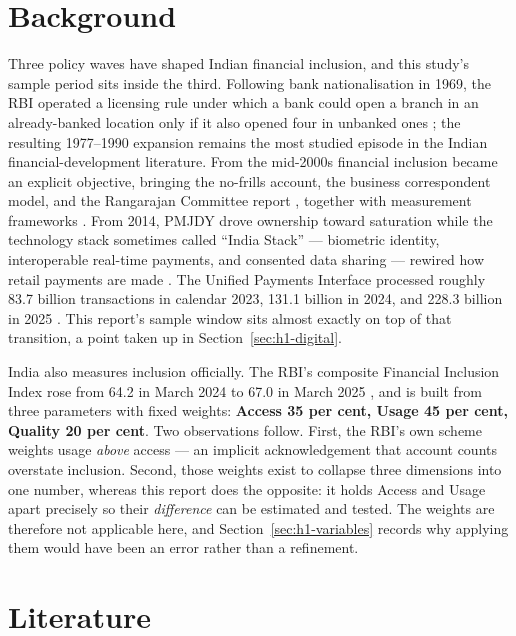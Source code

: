 \section{Background}
\label{sec:background}

Three policy waves have shaped Indian financial inclusion, and this study's sample period sits
inside the third. Following bank nationalisation in 1969, the RBI operated a licensing rule under
which a bank could open a branch in an already-banked location only if it also opened four in
unbanked ones \citep{burgess2005}; the resulting 1977--1990 expansion remains the most studied
episode in the Indian financial-development literature. From the mid-2000s financial inclusion
became an explicit objective, bringing the no-frills account, the business correspondent model, and
the Rangarajan Committee report \citep{rangarajan2008}, together with measurement frameworks
\citep{sarma2008,sarma2012}. From 2014, PMJDY drove ownership toward saturation while the
technology stack sometimes called ``India Stack'' --- biometric identity, interoperable real-time
payments, and consented data sharing --- rewired how retail payments are made \citep{dsilva2019}.
The Unified Payments Interface processed roughly 83.7 billion transactions in calendar 2023, 131.1
billion in 2024, and 228.3 billion in 2025 \citep{npci2025}. This report's sample window sits almost
exactly on top of that transition, a point taken up in Section~\ref{sec:h1-digital}.

India also measures inclusion officially. The RBI's composite Financial Inclusion Index rose from
64.2 in March 2024 to 67.0 in March 2025 \citep{rbi_fiindex2025}, and is built from three parameters
with fixed weights: \textbf{Access 35 per cent, Usage 45 per cent, Quality 20 per cent}. Two
observations follow. First, the RBI's own scheme weights usage \emph{above} access --- an implicit
acknowledgement that account counts overstate inclusion. Second, those weights exist to collapse
three dimensions into one number, whereas this report does the opposite: it holds Access and Usage
apart precisely so their \emph{difference} can be estimated and tested. The weights are therefore
not applicable here, and Section~\ref{sec:h1-variables} records why applying them would have been
an error rather than a refinement.

\section{Literature}
\label{sec:literature}

